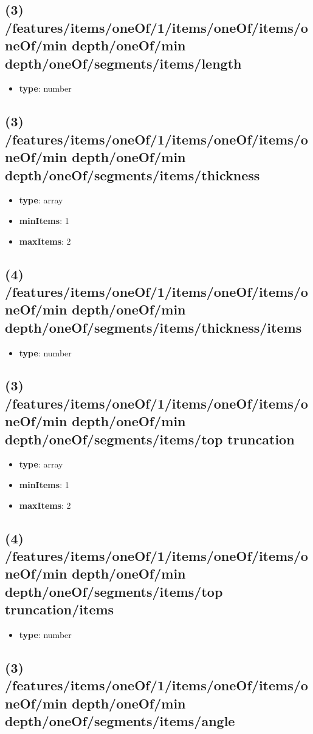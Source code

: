 \subsection{(3) /features/items/oneOf/1/items/oneOf/items/oneOf/min depth/oneOf/min depth/oneOf/segments/items/length}
\begin{itemize}[leftmargin=3em]\item {\bf type}: number
\end{itemize}\subsection{(3) /features/items/oneOf/1/items/oneOf/items/oneOf/min depth/oneOf/min depth/oneOf/segments/items/thickness}
\begin{itemize}[leftmargin=3em]\item {\bf type}: array
\item {\bf minItems}: 1
\item {\bf maxItems}: 2
\end{itemize}\subsection{(4) /features/items/oneOf/1/items/oneOf/items/oneOf/min depth/oneOf/min depth/oneOf/segments/items/thickness/items}
\begin{itemize}[leftmargin=4em]\item {\bf type}: number
\end{itemize}\subsection{(3) /features/items/oneOf/1/items/oneOf/items/oneOf/min depth/oneOf/min depth/oneOf/segments/items/top truncation}
\begin{itemize}[leftmargin=3em]\item {\bf type}: array
\item {\bf minItems}: 1
\item {\bf maxItems}: 2
\end{itemize}\subsection{(4) /features/items/oneOf/1/items/oneOf/items/oneOf/min depth/oneOf/min depth/oneOf/segments/items/top truncation/items}
\begin{itemize}[leftmargin=4em]\item {\bf type}: number
\end{itemize}\subsection{(3) /features/items/oneOf/1/items/oneOf/items/oneOf/min depth/oneOf/min depth/oneOf/segments/items/angle}

